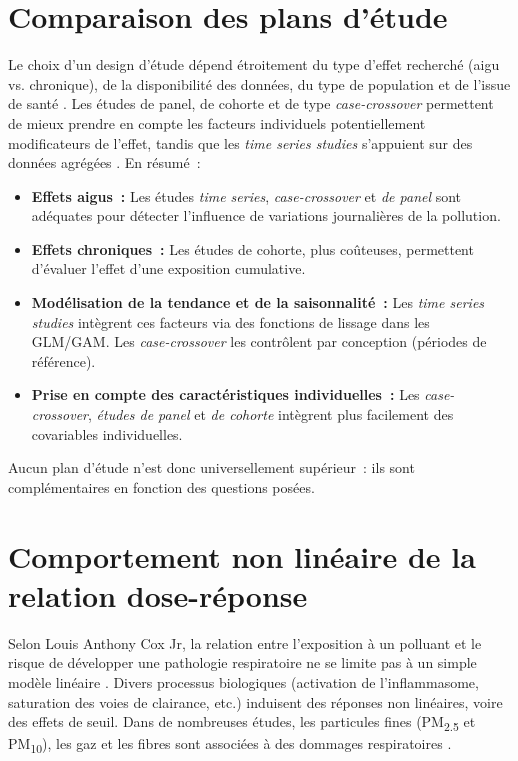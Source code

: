 \section{Comparaison des plans d’étude}
Le choix d’un design d’étude dépend étroitement du type d’effet recherché (aigu vs. chronique), de la disponibilité des données, du type de population et de l’issue de santé \citep{Vedal1996}. Les études de panel, de cohorte et de type \emph{case-crossover} permettent de mieux prendre en compte les facteurs individuels potentiellement modificateurs de l’effet, tandis que les \emph{time series studies} s’appuient sur des données agrégées \citep{WakefieldSalway2001}. En résumé :
\begin{itemize}
	\item \textbf{Effets aigus :} Les études \emph{time series}, \emph{case-crossover} et \emph{de panel} sont adéquates pour détecter l’influence de variations journalières de la pollution.
	\item \textbf{Effets chroniques :} Les études de cohorte, plus coûteuses, permettent d’évaluer l’effet d’une exposition cumulative.
	\item \textbf{Modélisation de la tendance et de la saisonnalité :} Les \emph{time series studies} intègrent ces facteurs via des fonctions de lissage dans les GLM/GAM. Les \emph{case-crossover} les contrôlent par conception (périodes de référence).
	\item \textbf{Prise en compte des caractéristiques individuelles :} Les \emph{case-crossover}, \emph{études de panel} et \emph{de cohorte} intègrent plus facilement des covariables individuelles.
\end{itemize}
Aucun plan d’étude n’est donc universellement supérieur : ils sont complémentaires en fonction des questions posées.

\section{Comportement non linéaire de la relation dose-réponse}
\label{sec:NonLinearDoseResponse}
Selon Louis Anthony Cox Jr, la relation entre l’exposition à un polluant et le risque de développer une pathologie respiratoire ne se limite pas à un simple modèle linéaire \citep{cox2021quantitative}. Divers processus biologiques (activation de l’inflammasome, saturation des voies de clairance, etc.) induisent des réponses non linéaires, voire des effets de seuil. Dans de nombreuses études, les particules fines (PM\textsubscript{2.5} et PM\textsubscript{10}), les gaz et les fibres sont associées à des dommages respiratoires \citep{Bang2015,Donaldson2010,Mazurek2017}.

